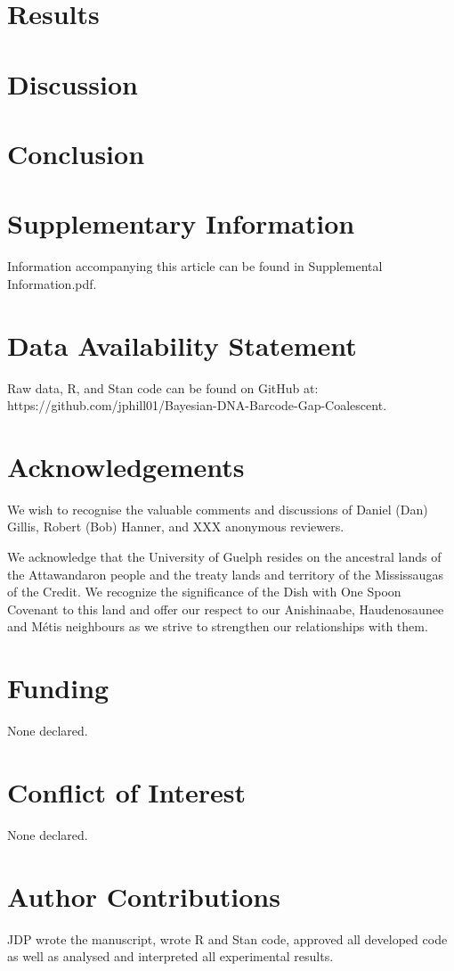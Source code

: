 \documentclass[12pt]{article}
\begin{document}
\section{Results}

\section{Discussion}

\section{Conclusion}


\newpage

\section*{Supplementary Information}

Information accompanying this article can be found in Supplemental Information.pdf.

\section*{Data Availability Statement}

Raw data, R, and Stan code can be found on GitHub at: \\ https://github.com/jphill01/Bayesian-DNA-Barcode-Gap-Coalescent.

\section*{Acknowledgements}

We wish to recognise the valuable comments and discussions of Daniel (Dan) Gillis, Robert (Bob) Hanner, and XXX anonymous reviewers.

We acknowledge that the University of Guelph resides on the ancestral lands of the Attawandaron people and the treaty lands and territory of the Mississaugas of the Credit. We recognize the significance of the Dish with One Spoon Covenant to this land and offer our respect to our Anishinaabe, Haudenosaunee and M{\'e}tis neighbours as we strive to strengthen our relationships with them.

\section*{Funding}

None declared.

\section*{Conflict of Interest}

None declared.

\section*{Author Contributions}

JDP wrote the manuscript, wrote R and Stan code, approved all developed code as well as analysed and interpreted all experimental results. 



\end{document}
